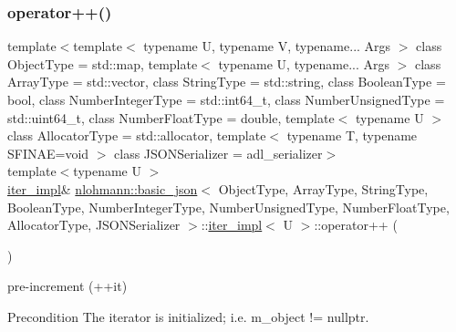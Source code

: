 \subsubsection{\texorpdfstring{operator++()}{operator++()}\hspace{0.1cm}{\footnotesize\ttfamily [2/2]}}
{\footnotesize\ttfamily template$<$template$<$ typename U, typename V, typename... Args $>$ class Object\+Type = std\+::map, template$<$ typename U, typename... Args $>$ class Array\+Type = std\+::vector, class String\+Type  = std\+::string, class Boolean\+Type  = bool, class Number\+Integer\+Type  = std\+::int64\+\_\+t, class Number\+Unsigned\+Type  = std\+::uint64\+\_\+t, class Number\+Float\+Type  = double, template$<$ typename U $>$ class Allocator\+Type = std\+::allocator, template$<$ typename T, typename S\+F\+I\+N\+A\+E=void $>$ class J\+S\+O\+N\+Serializer = adl\+\_\+serializer$>$ \\
template$<$typename U $>$ \\
\hyperlink{classnlohmann_1_1basic__json_1_1iter__impl}{iter\+\_\+impl}\& \hyperlink{classnlohmann_1_1basic__json}{nlohmann\+::basic\+\_\+json}$<$ Object\+Type, Array\+Type, String\+Type, Boolean\+Type, Number\+Integer\+Type, Number\+Unsigned\+Type, Number\+Float\+Type, Allocator\+Type, J\+S\+O\+N\+Serializer $>$\+::\hyperlink{classnlohmann_1_1basic__json_1_1iter__impl}{iter\+\_\+impl}$<$ U $>$\+::operator++ (\begin{DoxyParamCaption}{ }\end{DoxyParamCaption})\hspace{0.3cm}{\ttfamily [inline]}}



pre-\/increment (++it) 

\begin{DoxyPrecond}{Precondition}
The iterator is initialized; i.\+e. {\ttfamily m\+\_\+object != nullptr}. 
\end{DoxyPrecond}
\mbox{\label{classnlohmann_1_1basic__json_1_1iter__impl_a170970e99b7a6d124da0fffa4cb76dba}} 
